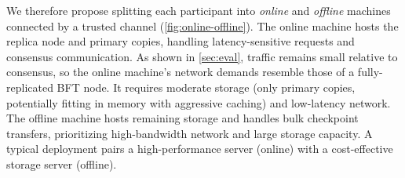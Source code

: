 We therefore propose splitting each participant into \emph{online} and \emph{offline} machines connected by a trusted channel (\cref{fig:online-offline}).
The online machine hosts the replica node and primary copies, handling latency-sensitive \retrieve requests and consensus communication.
As shown in \cref{sec:eval}, \retrieve traffic remains small relative to consensus, so the online machine's network demands resemble those of a fully-replicated BFT node.
It requires moderate storage (only primary copies, potentially fitting in memory with aggressive caching) and low-latency network.
The offline machine hosts remaining storage and handles bulk checkpoint transfers, prioritizing high-bandwidth network and large storage capacity.
A typical deployment pairs a high-performance server (online) with a cost-effective storage server (offline).
